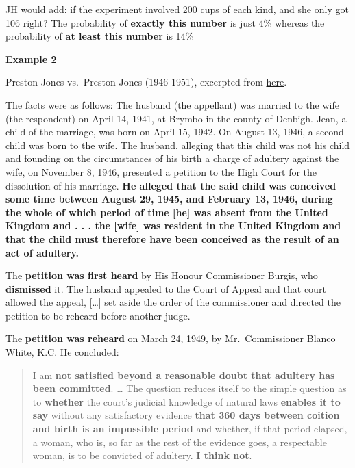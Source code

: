 \documentclass[]{book}
\begin{document}
JH would add: if the experiment involved 200 cups of each kind, and she only got 106 right? The probability of \textbf{exactly this number} is just 4\% whereas the probability of \textbf{at least this number} is 14\%

\textbf{Example 2}

Preston-Jones vs.~Preston-Jones (1946-1951), excerpted from \href{https://learning.uonbi.ac.ke/courses/GPR201/document/Selected_Cases/Preston-Jones_v_Preston-Jones_-Human_Gestation_Period-.pdf}{here}.

The facts were as follows: The husband (the appellant) was married to the wife (the respondent) on April 14, 1941, at Brymbo in the county of Denbigh. Jean, a child of the marriage, was born on April 15, 1942. On August 13, 1946, a second child was born to the wife. The husband, alleging that this child was not his child and founding on the circumstances of his birth a charge of adultery against the wife, on November 8, 1946, presented a petition to the High Court for the dissolution of his marriage. \textbf{He alleged that the said child was conceived some time between August 29, 1945, and February 13, 1946, during the whole of which period of time {[}he{]} was absent from the United Kingdom and . . . the {[}wife{]} was resident in the United Kingdom and that the child must therefore have been conceived as the result of an act of adultery.}

The \textbf{petition was first heard} by His Honour Commissioner Burgis, who \textbf{dismissed} it. The husband appealed to the Court of Appeal and that court allowed the appeal, {[}\ldots{}{]} set aside the order of the commissioner and directed the petition to be reheard before another judge.

The \textbf{petition was reheard} on March 24, 1949, by Mr.~Commissioner Blanco White, K.C. He concluded:

\begin{quote}
I am \textbf{not satisfied beyond a reasonable doubt that adultery has been committed}. \ldots{} The question reduces itself to the simple question as to \textbf{whether} the court's judicial knowledge of natural laws \textbf{enables it to say} without any satisfactory evidence \textbf{that 360 days between coition and birth is an impossible period} and whether, if that period elapsed, a woman, who is, so far as the rest of the evidence goes, a respectable woman, is to be convicted of adultery. \textbf{I think not}.
\end{quote}
\end{document}
